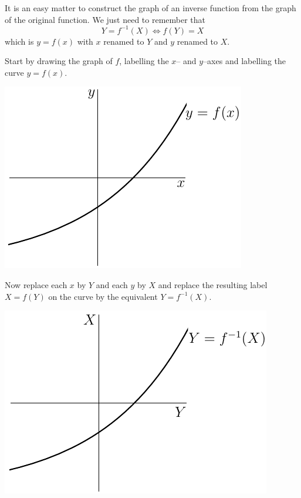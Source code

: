 It is an easy matter to construct the graph of an inverse function
from the graph of the original function. We just need to remember that
\begin{equation*}
Y=f^{-1}(X)  \iff f(Y)=X
\end{equation*}
which is $y=f(x)$ with $x$ renamed to $Y$ and $y$ renamed to $X$.

 Start by drawing the graph of $f$, labelling the $x$-- and $y$--axes
and labelling the curve $y=f(x)$.
\begin{efig}
\begin{center}
   \includegraphics{fInvA}
\end{center}
\end{efig}
Now replace each $x$ by $Y$ and each $y$ by $X$  and replace the resulting
label $X=f(Y)$ on the curve by the equivalent $Y=f^{-1}(X)$.
\begin{efig}
\begin{center}
   \includegraphics{fInvB}
\end{center}
\end{efig}

